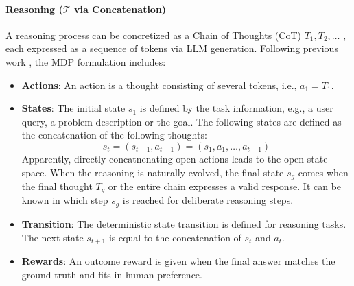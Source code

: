 \paragraph{Reasoning ($\mathcal{T}$ via Concatenation)}
A reasoning process can be concretized as a Chain of Thoughts (CoT) $T_1, T_2, \ldots$ \citep{wei2022chain}, each expressed as a sequence of tokens via LLM generation.
Following previous work \citep{li2024survey,wang2024q}, the MDP formulation includes:
\begin{itemize}
    \item \textbf{Actions}:  An action is a thought consisting of several tokens, i.e.,  $a_1=T_1$.
    
    \item \textbf{States}: The initial state $s_1$ is defined by the task information, e.g., a user query, a problem description or the goal. The following states are defined as the concatenation of the following thoughts:
    \begin{equation}
        s_t=\left(s_{t-1}, a_{t-1} \right) = \left(s_1, a_1 , \ldots, a_{t-1}\right) %
        \label{eq:state_by_action_concat}
    \end{equation}
    Apparently, directly concatnenating open actions leads to the open state space.
    When the reasoning is naturally evolved, the final state $s_g$ comes when the final thought $T_g$ or the entire chain expresses a valid response. It can be known in which step $s_g$ is reached for deliberate reasoning steps.
   
    \item \textbf{Transition}: The deterministic state transition is defined for reasoning tasks. The next state $s_{t+1}$ is equal to the concatenation of $s_t$ and $a_t$. 

    \item \textbf{Rewards}: An outcome reward is given when the final answer matches the ground truth and fits in human preference. 
\end{itemize}

